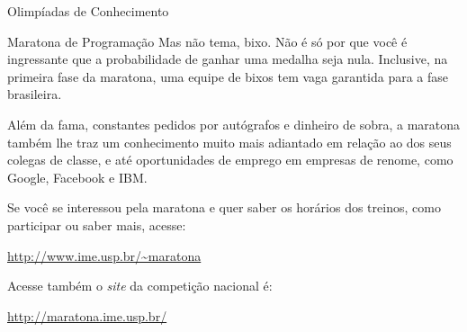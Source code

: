 \begin{subsecao}{Olimpíadas de Conhecimento}
\begin{subsubsecao}{Maratona de Programação}
Mas não tema, bixo. Não é só por que você é ingressante que
a probabilidade de ganhar uma medalha seja nula. Inclusive, na primeira
fase da maratona, uma equipe de bixos tem vaga garantida para a
fase brasileira.

Além da fama, constantes pedidos por autógrafos e dinheiro de sobra,
a maratona também lhe traz um conhecimento muito mais
adiantado em relação ao dos seus colegas de classe, e até oportunidades
de emprego em empresas de renome, como Google, Facebook e IBM.

Se você se interessou pela maratona e quer saber os horários dos
treinos, como participar ou saber mais, acesse:

\url{http://www.ime.usp.br/~maratona}

Acesse também o \textit{site} da competição nacional é:

\url{http://maratona.ime.usp.br/}

\end{subsubsecao}


\end{subsecao}
